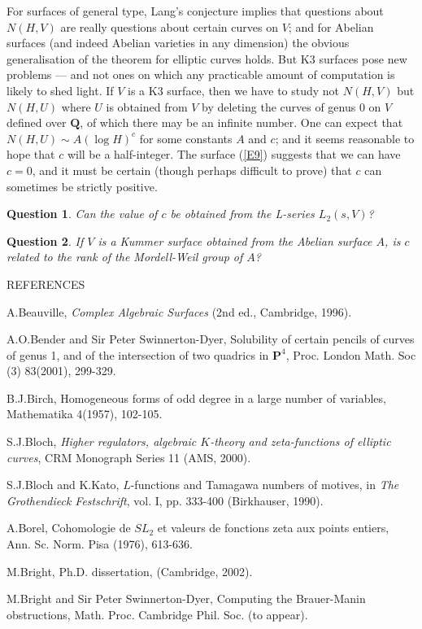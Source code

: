 \documentclass[12pt]{article}
\def\bP{{\mathbf P}}
\def\bQ{{\mathbf Q}}
\def\bpr{\begin{question} \label}
\def\epr{\end{question}}
\newtheorem{question}{Question}
\begin{document}
For surfaces of general type, Lang's conjecture implies that questions about
$N(H,V)$ are really questions about certain curves on $V$; and for Abelian
surfaces (and indeed Abelian varieties in any dimension) the obvious
generalisation of the theorem for elliptic curves holds. But K3 surfaces
pose new problems --- and not ones on which any practicable amount of
computation is likely to shed light. If $V$ is a K3 surface, then we have to
study not $N(H,V)$ but $N(H,U)$ where $U$ is obtained from $V$ by deleting the
curves of genus 0 on $V$ defined over $\bQ$, of which there may be an infinite
number. One can expect
that $N(H,U)\sim A(\log H)^c$ for some constants $A$ and $c$; and
it seems reasonable to hope that $c$ will be a half-integer. The surface
(\ref{E9}) suggests that we can have $c=0$, and it must be certain (though
perhaps difficult to prove) that $c$ can sometimes be strictly positive.
\bpr{Q17} Can the value of $c$ be obtained from the L-series $L_2(s,V)$?
\epr
\bpr{Q18} If $V$ is a Kummer surface obtained from the Abelian surface $A$,
is $c$ related to the rank of the Mordell-Weil group of $A$?
\epr


\bigskip

\begin{center} REFERENCES \end{center}

\noindent [1] A.Beauville, \textit{Complex Algebraic Surfaces} (2nd ed.,
Cambridge, 1996). 

\noindent [2] A.O.Bender and Sir Peter Swinnerton-Dyer, Solubility of certain
pencils of curves of genus 1, and of the intersection of two quadrics in
$\bP^4$, Proc. London Math. Soc (3) 83(2001), 299-329.

\noindent [3] B.J.Birch, Homogeneous forms of odd degree in a large number
of variables, Mathematika 4(1957), 102-105.

\noindent [4] S.J.Bloch, \textit{Higher regulators, algebraic $K$-theory and
zeta-functions of elliptic curves}, CRM Monograph Series 11 (AMS, 2000).

\noindent [5] S.J.Bloch and K.Kato, $L$-functions and Tamagawa numbers of
motives, in \textit{The Grothendieck Festschrift}, vol. I, pp. 333-400
(Birkhauser, 1990).

\noindent [6] A.Borel, Cohomologie de $SL_2$ et valeurs de fonctions
zeta aux points entiers, Ann. Sc. Norm. Pisa (1976), 613-636.

\noindent [7] M.Bright, Ph.D. dissertation, (Cambridge, 2002).

\noindent [8] M.Bright and Sir Peter Swinnerton-Dyer, Computing the
Brauer-Manin obstructions, Math. Proc. Cambridge Phil. Soc. (to appear).
\end{document}
